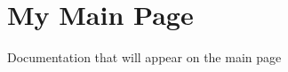 \chapter{My Main Page}
\hypertarget{index}{}\label{index}
\label{index_mainpage}%
%


Documentation that will appear on the main page 